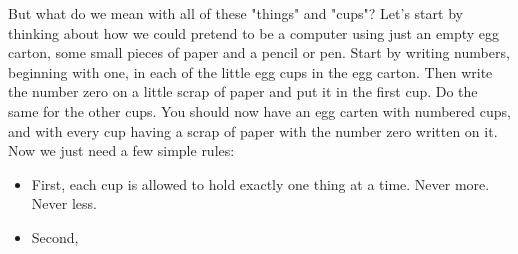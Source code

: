 But what do we mean with all of these "things" and "cups"?
Let's start by thinking about how we could pretend to be a computer using
just an empty egg carton, some small pieces of paper and a pencil or pen.
Start by writing numbers, beginning with one, in each of the
little egg cups in the egg carton.
Then write the number zero on a little scrap of paper and put it in the
first cup.  Do the same for the other cups.
You should now have an egg carten with numbered cups,
and with every cup having a scrap of paper with the number zero written
on it. Now we just need a few simple rules:

\begin{itemize}
  \item First, each cup is allowed to hold exactly one thing at a time. Never more. Never less.
\item Second,
\end{itemize}

